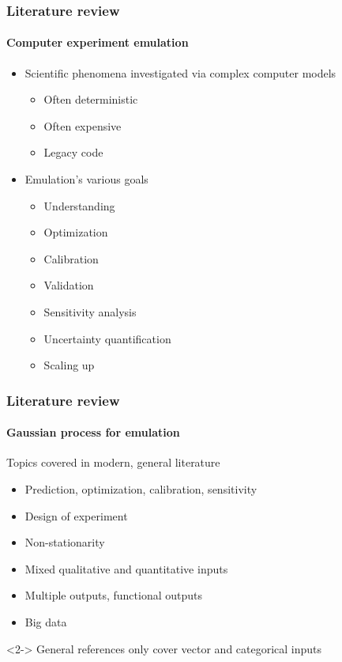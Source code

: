 \documentclass[handout]{snedecorbeamer}
\begin{document}
\begin{frame}
  \frametitle{Literature review}
  \framesubtitle{Computer experiment emulation}
  \begin{itemize}
  \item<2-> Scientific phenomena investigated via complex computer
    models~\citep{sacks1989,currin1991,koehler1996}
    \begin{itemize}
    \item Often deterministic
    \item Often expensive
    \item Legacy code
    \end{itemize}
  \item<3-> Emulation's various goals
    \begin{itemize}
    \item Understanding
    \item Optimization~\citep{jones1998,ohagan1992}
    \item Calibration~\citep{higdon2008,higdon2008a,kennedy2001}
    \item Validation~\citep{bayarri2007}
    \item Sensitivity analysis~\citep{campbell2006,iooss2009,morris2018}
    \item Uncertainty quantification
    \item Scaling up
    \end{itemize}
  \end{itemize}
\end{frame}

\begin{frame}
  \frametitle{Literature review}
  \framesubtitle{Gaussian process for emulation}

  Topics covered in modern, general
  literature~\citep{santner2003,santner2018,gramacy2020}
  \begin{itemize}
  \item Prediction, optimization, calibration, sensitivity
  \item Design of experiment
  \item Non-stationarity
  \item Mixed qualitative and quantitative inputs
  \item Multiple outputs, functional outputs
  \item Big data
  \end{itemize}

  \vfill{}
  \begin{exampleblock}{}<2->
    General references only cover vector and categorical inputs
  \end{exampleblock}
\end{frame}
\end{document}
